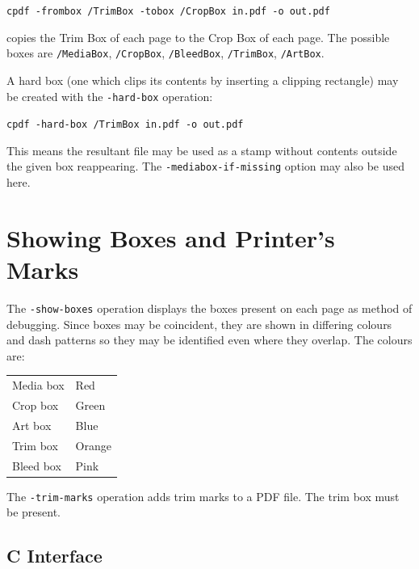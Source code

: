 \documentclass{book}
\begin{document}
  \begin{framed}
    \noindent\small\verb!cpdf -frombox /TrimBox -tobox /CropBox in.pdf -o out.pdf!
  \end{framed}
  \noindent copies the Trim Box of each page to the Crop Box of each page. The possible boxes are \texttt{/MediaBox}, \texttt{/CropBox}, \texttt{/BleedBox}, \texttt{/TrimBox}, \texttt{/ArtBox}.\pagestyle{empty}\thispagestyle{fancy}

A hard box (one which clips its contents by inserting a clipping rectangle) may be created with the \texttt{-hard-box} operation:

  \begin{framed}
    \noindent\small\verb!cpdf -hard-box /TrimBox in.pdf -o out.pdf!
  \end{framed}

\noindent This means the resultant file may be used as a stamp without contents outside the given box reappearing. The \texttt{-mediabox-if-missing} option may also be used here.

\section{Showing Boxes and Printer's Marks}

The \texttt{-show-boxes} operation displays the boxes present on each page as method of debugging. Since boxes may be coincident, they are shown in differing colours and dash patterns so they may be identified even where they overlap. The colours are:

\medskip
\begin{tabular}{ll}
Media box & Red \\
Crop box & Green \\
Art box & Blue \\
Trim box & Orange \\
Bleed box & Pink 
\end{tabular}
\medskip

\noindent  The \texttt{-trim-marks} operation adds trim marks to a PDF file. The trim box must be present.
\thispagestyle{fancy}

\begin{cpdflib}
\clearpage
\section*{C Interface}
\begin{small}\tt

\end{small}
\end{cpdflib}
\end{document}
